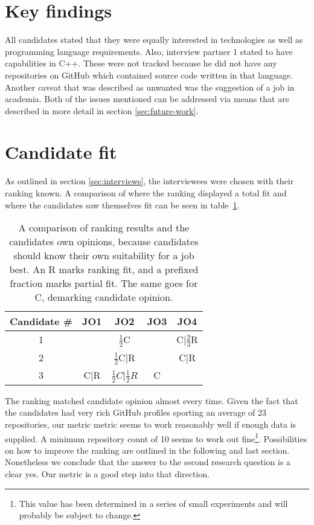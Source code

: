 \section{Key findings}\label{sec:key-findings}
All candidates stated that they were equally interested in technologies as well as programming language requirements. Also, interview partner 1 stated to have capabilities in C++. These were not tracked because he did not have any repositories on GitHub which contained source code written in that language. Another caveat that was described as unwanted was the suggestion of a job in academia. Both of the issues mentioned can be addressed via means that are described in more detail in section \ref{sec:future-work}.

\section{Candidate fit}
As outlined in section \ref{sec:interviews}, the interviewees were chosen with their ranking known. A comparison of where the ranking displayed a total fit and where the candidates saw themselves fit can be seen in table~\ref{table:rank-comparison}.

\begin{table}
\centering
\begin{tabular}{c|cccc}
Candidate \# & JO1 & JO2 & JO3 & JO4\\
\hline
           1 & & $\frac{1}{2}$C & & C|$\frac{2}{3}$R\\
           2 & & $\frac{1}{2}$C|R & & C|R\\
           3 & C|R & $\frac{1}{2}C$|$\frac{1}{2}R$ & C & \\
\end{tabular}
\caption{A comparison of ranking results and the candidates own opinions, because candidates should know their own suitability for a job best. An R marks ranking fit, and a prefixed fraction marks partial fit. The same goes for C, demarking candidate opinion.}
\label{table:rank-comparison}
\end{table}

The ranking matched candidate opinion almost every time. Given the fact that the candidates had very rich GitHub profiles sporting an average of 23 repositories, our metric metric seems to work reasonably well if enough data is supplied. A minimum repository count of 10 seems to work out fine\footnote{This value has been determined in a series of small experiments and will probably be subject to change.}. Possibilities on how to improve the ranking are outlined in the following and last section. Nonetheless we conclude that the answer to the second research question is a clear yes. Our metric is a good step into that direction.